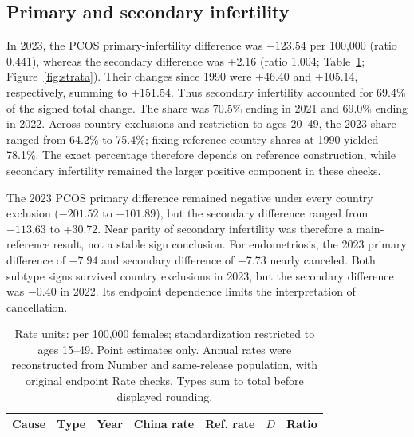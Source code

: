 \documentclass[11pt,a4paper]{article}
\begin{document}
\subsection{Primary and secondary infertility}
In 2023, the PCOS primary-infertility difference was $-123.54$ per 100,000 (ratio 0.441), whereas the secondary difference was +2.16 (ratio 1.004; Table~\ref{tab:strata}; Figure~\ref{fig:strata}). Their changes since 1990 were +46.40 and +105.14, respectively, summing to +151.54. Thus secondary infertility accounted for 69.4\% of the signed total change. The share was 70.5\% ending in 2021 and 69.0\% ending in 2022. Across country exclusions and restriction to ages 20--49, the 2023 share ranged from 64.2\% to 75.4\%; fixing reference-country shares at 1990 yielded 78.1\%. The exact percentage therefore depends on reference construction, while secondary infertility remained the larger positive component in these checks.

The 2023 PCOS primary difference remained negative under every country exclusion ($-201.52$ to $-101.89$), but the secondary difference ranged from $-113.63$ to +30.72. Near parity of secondary infertility was therefore a main-reference result, not a stable sign conclusion. For endometriosis, the 2023 primary difference of $-7.94$ and secondary difference of +7.73 nearly canceled. Both subtype signs survived country exclusions in 2023, but the secondary difference was $-0.40$ in 2022. Its endpoint dependence limits the interpretation of cancellation.

\begin{table}[htbp]\centering\small{}
\caption{Primary and secondary infertility prevalence at the endpoints.}\label{tab:strata}
\setlength{\tabcolsep}{4pt}
\begin{tabular}{lllrrrr}\toprule
Cause & Type & Year & China rate & Ref. rate & $D$ & Ratio\\\midrule
\end{tabular}
\caption*{Rate units: per 100,000 females; standardization restricted to ages 15--49. Point estimates only. Annual rates were reconstructed from Number and same-release population, with original endpoint Rate checks. Types sum to total before displayed rounding.}
\end{table}
\end{document}
